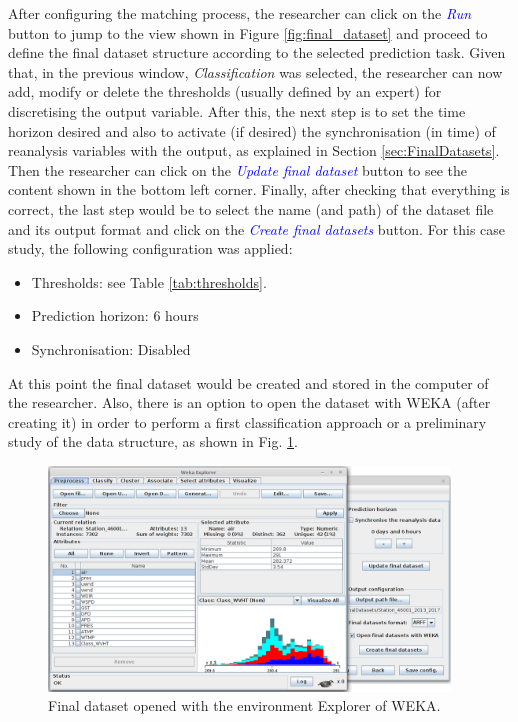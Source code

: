 \documentclass[review]{elsarticle}
\begin{document}
		After configuring the matching process, the researcher can click on the \textcolor{blue}{\textit{Run}} button to jump to the view shown in Figure \ref{fig:final_dataset} and proceed to define the final dataset structure according to the selected prediction task. Given that, in the previous window, \textit{Classification} was selected, the researcher can now add, modify or delete the thresholds (usually defined by an expert) for discretising the output variable. After this, the next step is to set the time horizon desired and also to activate (if desired) the synchronisation (in time) of reanalysis variables with the output, as explained in Section {\ref{sec:FinalDatasets}}. Then the researcher can click on the \textcolor{blue}{\textit{Update final dataset}} button to see the content shown in the bottom left corner. Finally, after checking that everything is correct, the last step would be to select the name (and path) of the dataset file and its output format and click on the \textcolor{blue}{\textit{Create final datasets}} button. For this case study, the following configuration was applied:		
		\begin{itemize}
			\item Thresholds: see Table \ref{tab:thresholds}.
			\item Prediction horizon: 6 hours
			\item Synchronisation: Disabled
		\end{itemize}
		
		At this point the final dataset would be created and stored in the computer of the researcher. Also, there is an option to open the dataset with WEKA (after creating it) in order to perform a first classification approach or a preliminary study of the data structure, as shown in Fig. \ref{fig:openigFinalDatasetWeka}.
		
		\begin{figure}[ht!]
			\centering
			\includegraphics[width=0.95\textwidth]{figures/FigureOpeningFinalDatasetWeka.png}
			\caption{Final dataset opened with the environment Explorer of WEKA.}
			\label{fig:openigFinalDatasetWeka}
		\end{figure}
		
\end{document}
